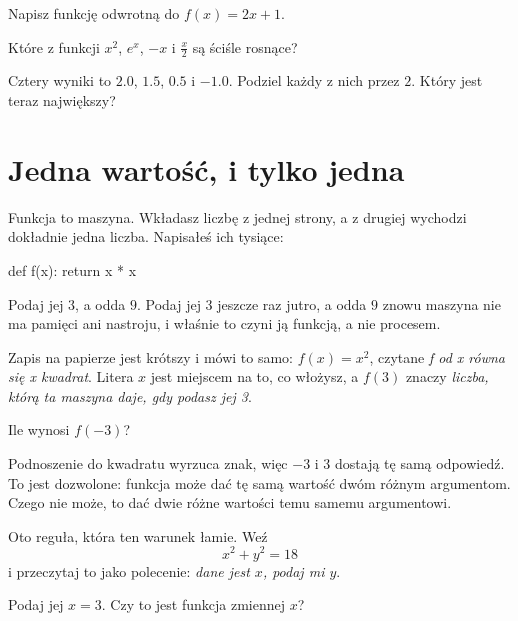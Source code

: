 \begin{quiz}
\item Napisz funkcję odwrotną do $f(x) = 2x + 1$. 
\item Które z funkcji $x^{2}$, $e^{x}$, $-x$ i $\frac{x}{2}$ są ściśle
  rosnące? 
\item Cztery wyniki to $\num{2.0}$, $\num{1.5}$, $\num{0.5}$ i $-\num{1.0}$.
  Podziel każdy z nich przez $2$. Który jest teraz największy?
\end{quiz}

\section{Jedna wartość, i tylko jedna}
\label{sec:F05-machine}

\begin{fr}
Funkcja to maszyna. Wkładasz liczbę z jednej strony, a z drugiej wychodzi
dokładnie jedna liczba. Napisałeś ich tysiące:

\begin{python}
def f(x):
    return x * x
\end{python}

Podaj jej $3$, a odda $9$. Podaj jej $3$ jeszcze raz jutro, a odda $9$ znowu
\dash{} maszyna nie ma pamięci ani nastroju, i właśnie to czyni ją funkcją, a
nie procesem.

Zapis na papierze jest krótszy i mówi to samo: $f(x) = x^{2}$, czytane
\emph{f od x równa się x kwadrat}. Litera $x$ jest miejscem na to, co włożysz,
a $f(3)$ znaczy \emph{liczba, którą ta maszyna daje, gdy podasz jej 3}.

Ile wynosi $f(-3)$?
\nextframe
\end{fr}

\begin{fr}
Podnoszenie do kwadratu wyrzuca znak, więc $-3$ i $3$ dostają tę samą
odpowiedź. To jest dozwolone: funkcja może dać tę samą wartość dwóm różnym
argumentom. Czego nie może, to dać dwie różne wartości temu samemu
argumentowi.

Oto reguła, która ten warunek łamie. Weź
\[ x^{2} + y^{2} = 18 \]
i przeczytaj to jako polecenie: \emph{dane jest $x$, podaj mi $y$}.

Podaj jej $x = 3$. Czy to jest funkcja zmiennej $x$?
\nextframe
\end{fr}

